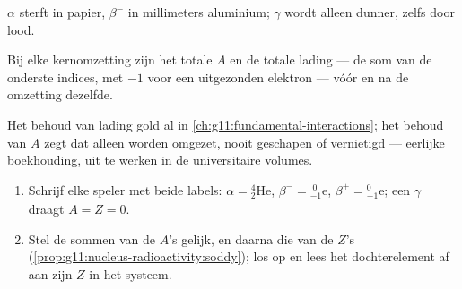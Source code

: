 \begin{omfigure}

{\small $\alpha$ sterft in papier, $\beta^-$ in millimeters aluminium;
$\gamma$ wordt alleen dunner, zelfs door lood.}
\end{omfigure}

\begin{proposition}\label{prop:g11:nucleus-radioactivity:soddy}
Bij elke kernomzetting zijn het totale  $A$ en de totale lading
--- de som van de onderste indices, met $-1$ voor een uitgezonden elektron
--- vóór en na de omzetting dezelfde.
\end{proposition}
\admitted

\begin{remark}
Het behoud van lading gold al in \cref{ch:g11:fundamental-interactions};
het behoud van $A$ zegt dat  alleen worden omgezet, nooit
geschapen of vernietigd --- eerlijke boekhouding, uit te werken in de
universitaire volumes.
\end{remark}

\begin{method}\label{met:g11:nucleus-radioactivity:balance}
\begin{enumerate}
  \item Schrijf elke speler met beide labels:
        $\alpha = {}^{4}_{2}\mathrm{He}$,
        $\beta^- = {}^{\;0}_{-1}\mathrm{e}$,
        $\beta^+ = {}^{0}_{+1}\mathrm{e}$; een $\gamma$ draagt
        $A = Z = 0$.
  \item Stel de sommen van de $A$'s gelijk, en daarna die van de $Z$'s
        (\cref{prop:g11:nucleus-radioactivity:soddy}); los op en lees het
        dochterelement af aan zijn $Z$ in het  systeem.
\end{enumerate}
\end{method}

